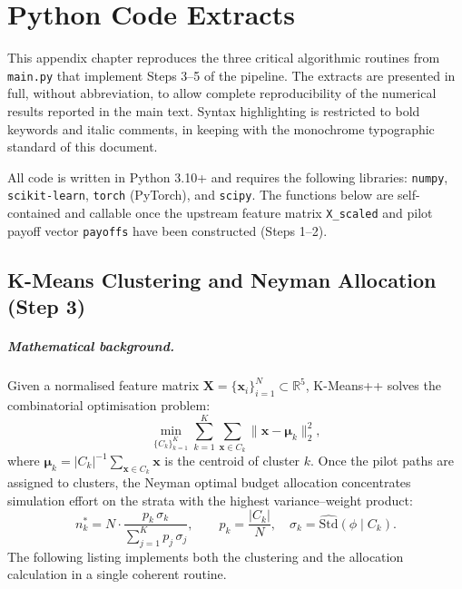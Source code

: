 \chapter{Python Code Extracts}
\label{app:code}

This appendix chapter reproduces the three critical algorithmic
routines from \texttt{main.py} that implement Steps 3--5 of the
pipeline.  The extracts are presented in full, without
abbreviation, to allow complete reproducibility of the numerical
results reported in the main text.  Syntax highlighting is
restricted to bold keywords and italic comments, in keeping with
the monochrome typographic standard of this document.

All code is written in Python 3.10+ and requires the following
libraries: \texttt{numpy}, \texttt{scikit-learn},
\texttt{torch} (PyTorch), and \texttt{scipy}.  The functions
below are self-contained and callable once the upstream feature
matrix \texttt{X\_scaled} and pilot payoff vector \texttt{payoffs}
have been constructed (Steps 1--2).

\section{K-Means Clustering and Neyman Allocation (Step 3)}
\label{app:code-kmeans}

\paragraph{Mathematical background.}
Given a normalised feature matrix
$\mathbf{X} = \{\mathbf{x}_i\}_{i=1}^{N} \subset \mathbb{R}^5$,
K-Means++ solves the combinatorial optimisation problem:
\[
  \min_{\{C_k\}_{k=1}^K}
  \sum_{k=1}^K \sum_{\mathbf{x} \in C_k}
  \|\mathbf{x} - \boldsymbol{\mu}_k\|_2^2,
\]
where $\boldsymbol{\mu}_k = |C_k|^{-1}\sum_{\mathbf{x} \in C_k}\mathbf{x}$
is the centroid of cluster $k$.  Once the pilot paths are assigned
to clusters, the Neyman optimal budget allocation concentrates
simulation effort on the strata with the highest variance--weight
product:
\[
  n_k^* = N \cdot
  \frac{p_k\,\sigma_k}{\sum_{j=1}^K p_j\,\sigma_j},
  \qquad
  p_k = \frac{|C_k|}{N}, \quad
  \sigma_k = \widehat{\mathrm{Std}}(\phi \mid C_k).
\]
The following listing implements both the clustering and the
allocation calculation in a single coherent routine.

